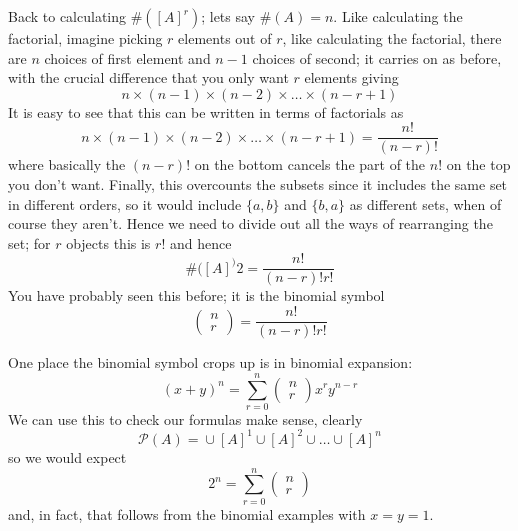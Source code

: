 \documentclass[11pt,a4paper]{scrartcl}
\begin{document}
Back to calculating $\#([A]^r)$; lets say $\#(A)=n$. Like calculating
the factorial, imagine picking $r$ elements out of $r$, like
calculating the factorial, there are $n$ choices of first element and
$n-1$ choices of second; it carries on as before, with the crucial
difference that you only want $r$ elements giving
\begin{equation}
  n\times(n-1)\times(n-2)\times\ldots\times(n-r+1)
\end{equation}
It is easy to see that this can be written in terms of factorials as
\begin{equation}
  n\times(n-1)\times(n-2)\times\ldots\times(n-r+1)=\frac{n!}{(n-r)!}
\end{equation}
where basically the $(n-r)!$ on the bottom cancels the part of the
$n!$ on the top you don't want. Finally, this overcounts the subsets
since it includes the same set in different orders, so it would
include $\{a,b\}$ and $\{b,a\}$ as different sets, when of course they
aren't. Hence we need to divide out all the ways of rearranging the
set; for $r$ objects this is $r!$ and hence
\begin{equation}
  \#([A]^)2=\frac{n!}{(n-r)!r!}
\end{equation}
You have probably seen this before; it is the binomial symbol
\begin{equation}
  \left(\begin{array}{c}n\\r\end{array}\right)=\frac{n!}{(n-r)!r!}
\end{equation}

One place the binomial symbol crops up is in binomial expansion:
\begin{equation}
  (x+y)^n=\sum_{r=0}^n \left(\begin{array}{c}n\\r\end{array}\right)x^ry^{n-r}
\end{equation}
We can use this to check our formulas make sense, clearly
\begin{equation}
  \mathcal{P}(A)={}\cup [A]^1\cup [A]^2\cup \ldots \cup [A]^n
\end{equation}
so we would expect
\begin{equation}
  2^n=\sum_{r=0}^n \left(\begin{array}{c}n\\r\end{array}\right)
\end{equation}
and, in fact, that follows from the binomial examples with $x=y=1$.
\end{document}
